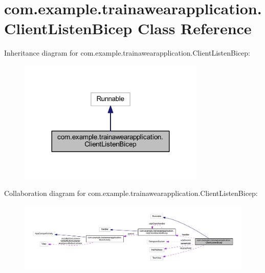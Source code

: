 \hypertarget{classcom_1_1example_1_1trainawearapplication_1_1_client_listen_bicep}{}\section{com.\+example.\+trainawearapplication.\+Client\+Listen\+Bicep Class Reference}
\label{classcom_1_1example_1_1trainawearapplication_1_1_client_listen_bicep}


Inheritance diagram for com.\+example.\+trainawearapplication.\+Client\+Listen\+Bicep\+:
\nopagebreak
\begin{figure}[H]
\begin{center}
\leavevmode
\includegraphics[width=252pt]{classcom_1_1example_1_1trainawearapplication_1_1_client_listen_bicep__inherit__graph}
\end{center}
\end{figure}


Collaboration diagram for com.\+example.\+trainawearapplication.\+Client\+Listen\+Bicep\+:
\nopagebreak
\begin{figure}[H]
\begin{center}
\leavevmode
\includegraphics[width=350pt]{classcom_1_1example_1_1trainawearapplication_1_1_client_listen_bicep__coll__graph}
\end{center}
\end{figure}
